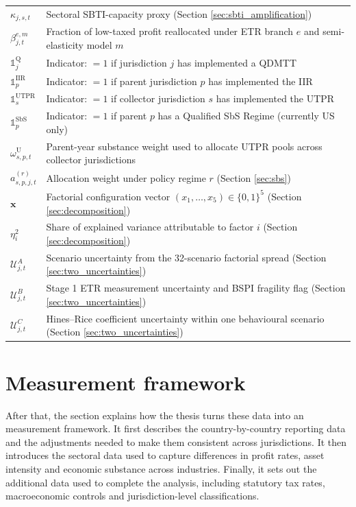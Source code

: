 \documentclass[11pt,a4paper]{article}
\begin{document}
\begin{table}[H]
\begin{tabular}{@{}ll@{}}
$\kappa_{j,s,t}$ & Sectoral SBTI-capacity proxy (Section \ref{sec:sbti_amplification}) \\
$\beta_{j,t}^{e,m}$ & Fraction of low-taxed profit reallocated under ETR branch $e$ and semi-elasticity model $m$ \\
$\mathbb{1}_j^{\text{Q}}$ & Indicator: $=1$ if jurisdiction $j$ has implemented a QDMTT \\
$\mathbb{1}_p^{\text{IIR}}$ & Indicator: $=1$ if parent jurisdiction $p$ has implemented the IIR \\
$\mathbb{1}_s^{\text{UTPR}}$ & Indicator: $=1$ if collector jurisdiction $s$ has implemented the UTPR \\
$\mathbb{1}_p^{\text{SbS}}$ & Indicator: $=1$ if parent $p$ has a Qualified SbS Regime (currently US only) \\
$\omega_{s,p,t}^{\text{U}}$ & Parent-year substance weight used to allocate UTPR pools across collector jurisdictions \\
$a_{s,p,j,t}^{(r)}$ & Allocation weight under policy regime $r$ (Section \ref{sec:sbs}) \\
$\mathbf{x}$ & Factorial configuration vector $(x_1, \ldots, x_5) \in \{0,1\}^5$ (Section \ref{sec:decomposition}) \\
$\eta_i^2$ & Share of explained variance attributable to factor $i$ (Section \ref{sec:decomposition}) \\
$\mathcal{U}^{A}_{j,t}$ & Scenario uncertainty from the 32-scenario factorial spread (Section \ref{sec:two_uncertainties}) \\
$\mathcal{U}^{B}_{j,t}$ & Stage 1 ETR measurement uncertainty and BSPI fragility flag (Section \ref{sec:two_uncertainties}) \\
$\mathcal{U}^{C}_{j,t}$ & Hines--Rice coefficient uncertainty within one behavioural scenario (Section \ref{sec:two_uncertainties}) \\
\bottomrule
\end{tabular}
\end{table}

\section{Measurement framework}\label{sec:measurement_framework}

After that, the section explains how the thesis turns these data into an measurement framework. It first describes the country-by-country reporting data and the adjustments needed to make them consistent across jurisdictions. It then introduces the sectoral data used to capture differences in profit rates, asset intensity and economic substance across industries. Finally, it sets out the additional data used to complete the analysis, including statutory tax rates, macroeconomic controls and jurisdiction-level classifications. 
\end{document}
